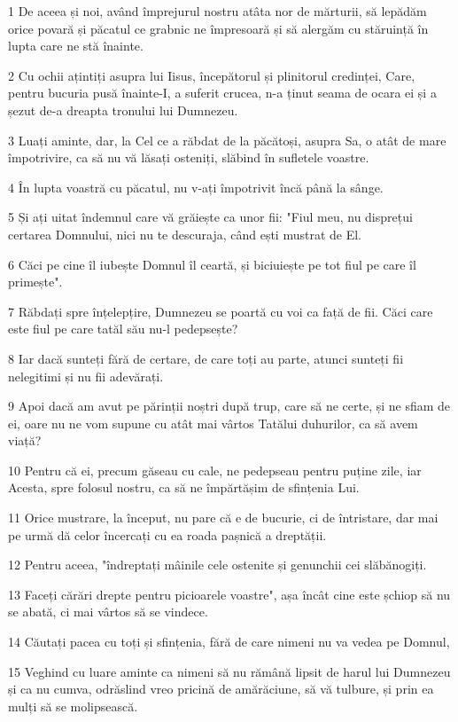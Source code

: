 \par 1 De aceea și noi, având împrejurul nostru atâta nor de mărturii, să lepădăm orice povară și păcatul ce grabnic ne împresoară și să alergăm cu stăruință în lupta care ne stă înainte.
\par 2 Cu ochii ațintiți asupra lui Iisus, începătorul și plinitorul credinței, Care, pentru bucuria pusă înainte-I, a suferit crucea, n-a ținut seama de ocara ei și a șezut de-a dreapta tronului lui Dumnezeu.
\par 3 Luați aminte, dar, la Cel ce a răbdat de la păcătoși, asupra Sa, o atât de mare împotrivire, ca să nu vă lăsați osteniți, slăbind în sufletele voastre.
\par 4 În lupta voastră cu păcatul, nu v-ați împotrivit încă până la sânge.
\par 5 Și ați uitat îndemnul care vă grăiește ca unor fii: "Fiul meu, nu disprețui certarea Domnului, nici nu te descuraja, când ești mustrat de El.
\par 6 Căci pe cine îl iubește Domnul îl ceartă, și biciuiește pe tot fiul pe care îl primește".
\par 7 Răbdați spre înțelepțire, Dumnezeu se poartă cu voi ca față de fii. Căci care este fiul pe care tatăl său nu-l pedepsește?
\par 8 Iar dacă sunteți fără de certare, de care toți au parte, atunci sunteți fii nelegitimi și nu fii adevărați.
\par 9 Apoi dacă am avut pe părinții noștri după trup, care să ne certe, și ne sfiam de ei, oare nu ne vom supune cu atât mai vârtos Tatălui duhurilor, ca să avem viață?
\par 10 Pentru că ei, precum găseau cu cale, ne pedepseau pentru puține zile, iar Acesta, spre folosul nostru, ca să ne împărtășim de sfințenia Lui.
\par 11 Orice mustrare, la început, nu pare că e de bucurie, ci de întristare, dar mai pe urmă dă celor încercați cu ea roada pașnică a dreptății.
\par 12 Pentru aceea, "îndreptați mâinile cele ostenite și genunchii cei slăbănogiți.
\par 13 Faceți cărări drepte pentru picioarele voastre", așa încât cine este șchiop să nu se abată, ci mai vârtos să se vindece.
\par 14 Căutați pacea cu toți și sfințenia, fără de care nimeni nu va vedea pe Domnul,
\par 15 Veghind cu luare aminte ca nimeni să nu rămână lipsit de harul lui Dumnezeu și ca nu cumva, odrăslind vreo pricină de amărăciune, să vă tulbure, și prin ea mulți să se molipsească.
